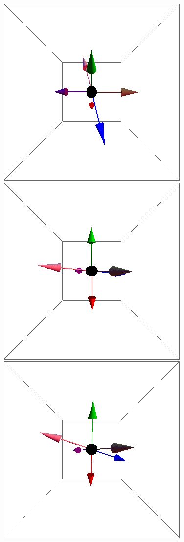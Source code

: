 \documentclass{article}
\begin{document}
\begin{figure}[ht]
\centering
\includegraphics[scale=0.27]{100/1S000to005R.png}
\includegraphics[scale=0.27]{100/2S000to005R.png}
\includegraphics[scale=0.27]{100/48S000to005R.png}

\end{figure}
\end{document}
